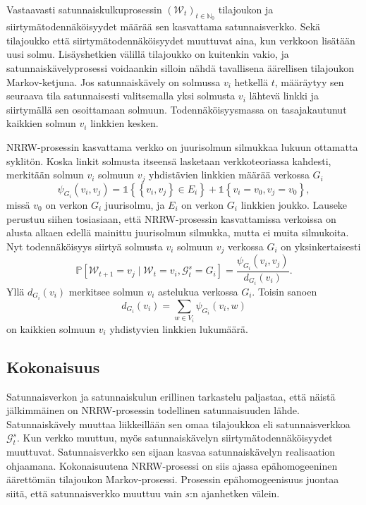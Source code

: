 \documentclass[finnish, 12pt, a4paper, sci, utf8, pdfa]{aaltothesis}
\newcommand{\N}{\mathbb{N}}
\newcommand{\Grandom}{\mathcal{G}}
\newcommand{\Wrandom}{\mathcal{W}}
\newcommand{\indicator}{\mathopen{\mathds{1}}}
\newcommand*{\prob}{\mathbb{P}}
\begin{document}
Vastaavasti satunnaiskulkuprosessin \( (\Wrandom_{t})_{t \in \N_{0}} \) tilajoukon ja siirtymätodennäköisyydet määrää sen kasvattama satunnaisverkko. Sekä tilajoukko että siirtymätodennäköisyydet muuttuvat aina, kun verkkoon lisätään uusi solmu. Lisäyshetkien välillä tilajoukko on kuitenkin vakio, ja satunnaiskävelyprosessi voidaankin silloin nähdä tavallisena äärellisen tilajoukon Markov-ketjuna. Jos satunnaiskävely on solmussa \( v_{i} \) hetkellä \( t \), määräytyy sen seuraava tila satunnaisesti valitsemalla yksi solmusta \( v_{i} \) lähtevä linkki ja siirtymällä sen osoittamaan solmuun. Todennäköisyysmassa on tasajakautunut kaikkien solmun \( v_{i} \) linkkien kesken. 

NRRW-prosessin kasvattama verkko on juurisolmun silmukkaa lukuun ottamatta syklitön. Koska linkit solmusta itseensä lasketaan verkkoteoriassa kahdesti, merkitään solmun \( v_{i} \) 
solmuun \( v_{j} \) yhdistävien linkkien määrää verkossa $ G_{i} $
\begin{equation}
   \psi_{G_{i}}(v_{i}, v_{j}) = \indicator \left\{ \left\{ v_{i}, v_{j} \right\} \in E_{i} \right\} + \indicator \left\{ v_{i} = v_{0}, v_{j} = v_{0} \right\},
   \label{equation:psi}
\end{equation}
missä $ v_{0} $ on verkon $ G_{i} $ juurisolmu, ja $ E_{i} $ on verkon $ G_{i} $ linkkien joukko. Lauseke perustuu siihen tosiasiaan, että NRRW-prosessin kasvattamissa verkoissa on alusta
alkaen edellä mainittu juurisolmun silmukka, mutta ei muita silmukoita. Nyt todennäköisyys siirtyä solmusta \( v_{i} \) solmuun \( v_{j} \) verkossa $ G_{i} $ on yksinkertaisesti
\begin{equation}
   \prob \left[ \Wrandom_{t+1} = v_{j} \mid \Wrandom_{t} = v_{i}, \Grandom_{t}^{s} = G_{i} \right] = \frac{\psi_{G_{i}}(v_{i}, v_{j})}{d_{G_{i}}(v_{i})}.
   \label{equation:verkko-tn}
\end{equation}
Yllä \( d_{G_{i}}(v_{i}) \) merkitsee solmun \( v_{i} \) astelukua verkossa $ G_{i} $. Toisin sanoen
\begin{equation}
   d_{G_{i}}(v_{i}) = \sum_{w \in V_{i}} \psi_{G_{i}}(v_{i}, w)
   \label{equation:asteluku}
\end{equation}
on kaikkien solmuun \( v_{i} \) yhdistyvien linkkien lukumäärä.

\subsection{Kokonaisuus}

Satunnaisverkon ja satunnaiskulun erillinen tarkastelu paljastaa, että näistä jälkimmäinen on NRRW-prosessin todellinen satunnaisuuden lähde. Satunnaiskävely muuttaa liikkeillään sen omaa tilajoukkoa eli satunnaisverkkoa \( \Grandom_{t}^{s} \). Kun verkko muuttuu, myös satunnaiskävelyn siirtymätodennäköisyydet muuttuvat. Satunnaisverkko sen sijaan kasvaa satunnaiskävelyn realisaation ohjaamana. Kokonaisuutena NRRW-prosessi on siis ajassa epähomogeeninen äärettömän tilajoukon Markov-prosessi. Prosessin epähomogeenisuus juontaa siitä, että satunnaisverkko muuttuu vain $ s $:n ajanhetken välein.
\end{document}

